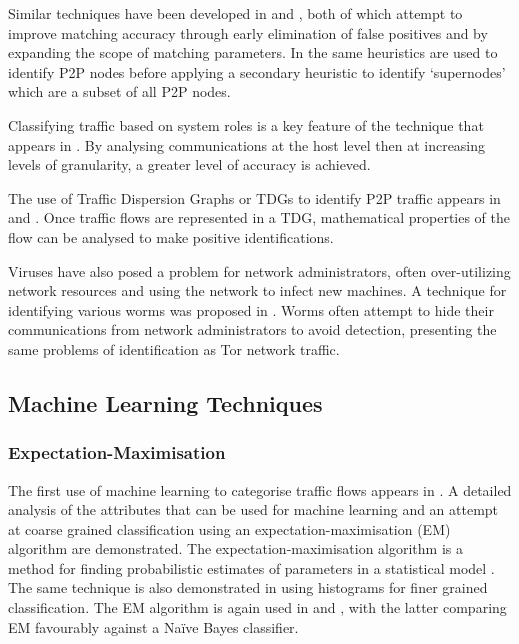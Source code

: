 \documentclass{ecuthesis}
\begin{document}
Similar techniques have been developed in \textcite{Perenyi:2006p6325} and
\textcite{John:2008p1376}, both of which attempt to improve matching accuracy
through early elimination of false positives and by expanding the scope of
matching parameters. In \textcite{Oneil:2004p6451} the same heuristics are used
to identify P2P nodes before applying a secondary heuristic to identify
‘supernodes’ which are a subset of all P2P nodes.

Classifying traffic based on system roles is a key feature of the technique
that appears in 
\parencite{Karagiannis:2005p6359}. By analysing communications at the host
level then at increasing levels of granularity, a greater level of accuracy is
achieved.

The use of Traffic Dispersion Graphs or TDGs to identify P2P traffic appears in
\textcite{Iliofotou:2008p6373} and \textcite{Iliofotou:2009p6461}. Once traffic
flows are represented in a TDG, mathematical properties of the flow can be
analysed to make positive identifications.

Viruses have also posed a problem for network administrators, often
over-utilizing network resources and using the network to infect new machines.
A technique for identifying various worms was proposed in
\textcite{Lazarevic:2003p6450}. Worms often attempt to hide their communications
from network administrators to avoid detection, presenting the same problems of
identification as Tor network traffic.

\subsection{Machine Learning Techniques}

\subsubsection{Expectation-Maximisation}

The first use of machine learning to categorise traffic flows appears in
\textcite{McGregor:2004p3826}. A detailed analysis of the attributes that can
be used for machine learning and an attempt at coarse grained classification
using an expectation-maximisation (EM) algorithm are demonstrated. The
expectation-maximisation algorithm is a method for finding probabilistic
estimates of parameters in a statistical model \parencite{UW:2010p7083}. The
same technique is also demonstrated in \textcite{Soule:2004p3817} using
histograms for finer grained classification.  The EM algorithm is again used in
\textcite{Zander:2005p6212} and \textcite{Erman:2006p3825}, with the latter
comparing EM favourably against a Na\"{i}ve Bayes classifier.
\end{document}

